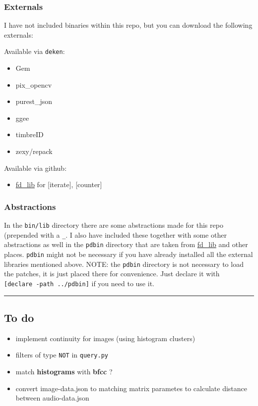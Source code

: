 \hypertarget{externals}{%
\subsubsection{Externals}\label{externals}}

I have not included binaries within this repo, but you can download the following externals:

Available via \texttt{deken}:

\begin{itemize}
\tightlist
\item
  Gem
\item
  pix\_opencv
\item
  purest\_json
\item
  ggee
\item
  timbreID
\item
  zexy/repack
\end{itemize}

Available via github:

\begin{itemize}
\tightlist
\item
  \href{https://github.com/fdch/fd_lib}{fd\_lib} for {[}iterate{]}, {[}counter{]}
\end{itemize}

\hypertarget{abstractions}{%
\subsubsection{Abstractions}\label{abstractions}}

In the \texttt{bin/lib} directory there are some abstractions made for this repo (prepended with a \texttt{\_}. I also have included these together with some other abstractions as well in the \texttt{pdbin} directory that are taken from \href{https://github.com/fdch/fd_lib}{fd\_lib} and other places. \texttt{pdbin} might not be necessary if you have already installed all the external libraries mentioned above. NOTE: the \texttt{pdbin} directory is not necessary to load the patches, it is just placed there for convenience. Just declare it with \texttt{{[}declare\ -path\ ../pdbin{]}} if you need to use it.

\begin{center}\rule{0.5\linewidth}{\linethickness}\end{center}

\hypertarget{to-do}{%
\subsection{To do}\label{to-do}}

\begin{itemize}
\tightlist
\item
  implement continuity for images (using histogram clusters)
\item
  filters of type \texttt{NOT} in \texttt{query.py}
\item
  match \textbf{histograms} with \textbf{bfcc} ?
\item
  convert image-data.json to matching matrix parametes to calculate distance between audio-data.json
\end{itemize}
